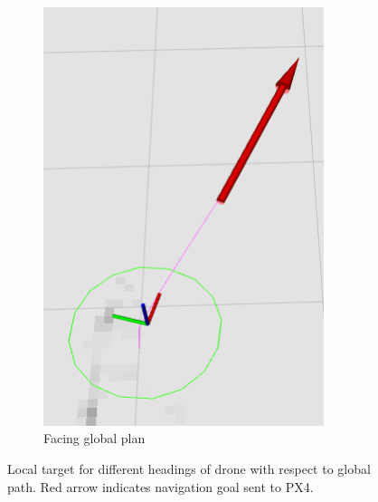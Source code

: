 \documentclass[capstone_report.tex]{subfiles}
\begin{document}
\begin{figure}[H]
\begin{subfigure}{0.5\textwidth}
        \includegraphics[width=0.9\textwidth]{imgs/tbm_facing_target.png}
        \caption{Facing global plan}
        \label{fig:tbm_heading_towards_global}
    \end{subfigure}
    \caption{Local target for different headings of drone with respect to global path.  Red arrow indicates navigation goal sent to PX4.}\label{fig:tbm}
\end{figure}
\end{document}
